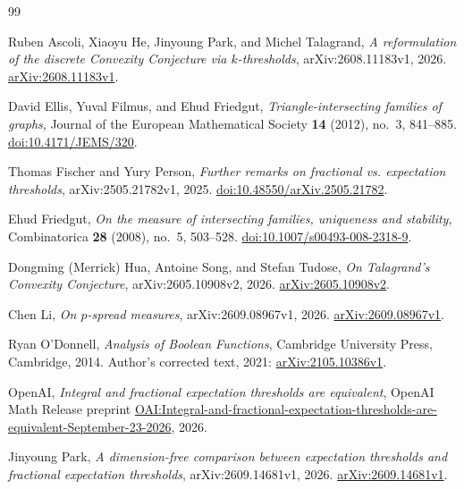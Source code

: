 \begin{thebibliography}{99}

Ruben Ascoli, Xiaoyu He, Jinyoung Park, and Michel Talagrand,
\emph{A reformulation of the discrete Convexity Conjecture via
$k$-thresholds},
arXiv:2608.11183v1, 2026.
\href{https://arxiv.org/abs/2608.11183v1}{arXiv:2608.11183v1}.

David Ellis, Yuval Filmus, and Ehud Friedgut,
\emph{Triangle-intersecting families of graphs},
Journal of the European Mathematical Society \textbf{14} (2012),
no.~3, 841--885.
\href{https://doi.org/10.4171/JEMS/320}{doi:10.4171/JEMS/320}.

Thomas Fischer and Yury Person,
\emph{Further remarks on fractional vs. expectation thresholds},
arXiv:2505.21782v1, 2025.
\href{https://doi.org/10.48550/arXiv.2505.21782}{doi:10.48550/arXiv.2505.21782}.

Ehud Friedgut,
\emph{On the measure of intersecting families, uniqueness and stability},
Combinatorica \textbf{28} (2008), no.~5, 503--528.
\href{https://doi.org/10.1007/s00493-008-2318-9}{doi:10.1007/s00493-008-2318-9}.

Dongming (Merrick) Hua, Antoine Song, and Stefan Tudose,
\emph{On Talagrand's Convexity Conjecture},
arXiv:2605.10908v2, 2026.
\href{https://arxiv.org/abs/2605.10908v2}{arXiv:2605.10908v2}.

Chen Li,
\emph{On $p$-spread measures},
arXiv:2609.08967v1, 2026.
\href{https://arxiv.org/abs/2609.08967v1}{arXiv:2609.08967v1}.

Ryan O'Donnell,
\emph{Analysis of Boolean Functions},
Cambridge University Press, Cambridge, 2014.
Author's corrected text, 2021:
\href{https://arxiv.org/abs/2105.10386v1}{arXiv:2105.10386v1}.

OpenAI,
\emph{Integral and fractional expectation thresholds are equivalent},
OpenAI Math Release preprint
\href{https://github.com/openai/math/blob/main/preprints/Integral-and-fractional-expectation-thresholds-are-equivalent-September-23-2026/paper.pdf}{OAI:Integral-and-fractional-expectation-thresholds-are-equivalent-September-23-2026},
2026.

Jinyoung Park,
\emph{A dimension-free comparison between expectation thresholds and
fractional expectation thresholds},
arXiv:2609.14681v1, 2026.
\href{https://arxiv.org/abs/2609.14681v1}{arXiv:2609.14681v1}.


\end{thebibliography}
